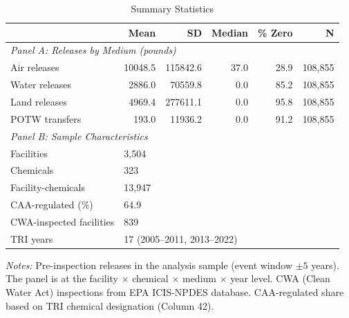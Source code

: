 \begin{table}[htbp]
\centering
\caption{Summary Statistics}
\label{tab:summary}
\begin{tabular}{lrrrrr}
\toprule
& Mean & SD & Median & \% Zero & N \\
\midrule
\multicolumn{6}{l}{\textit{Panel A: Releases by Medium (pounds)}} \\[3pt]
Air releases & 10048.5 & 115842.6 & 37.0 & 28.9 & 108,855 \\
Water releases & 2886.0 & 70559.8 & 0.0 & 85.2 & 108,855 \\
Land releases & 4969.4 & 277611.1 & 0.0 & 95.8 & 108,855 \\
POTW transfers & 193.0 & 11936.2 & 0.0 & 91.2 & 108,855 \\
\midrule
\multicolumn{6}{l}{\textit{Panel B: Sample Characteristics}} \\[3pt]
Facilities & \multicolumn{5}{l}{3,504} \\
Chemicals & \multicolumn{5}{l}{323} \\
Facility-chemicals & \multicolumn{5}{l}{13,947} \\
CAA-regulated (\%) & \multicolumn{5}{l}{64.9} \\
CWA-inspected facilities & \multicolumn{5}{l}{839} \\
TRI years & \multicolumn{5}{l}{17 (2005--2011, 2013--2022)} \\
\bottomrule
\end{tabular}
\begin{minipage}{0.95\textwidth}
\vspace{0.3em}
\footnotesize \textit{Notes:} Pre-inspection releases in the analysis sample (event window $\pm 5$ years). The panel is at the facility $\times$ chemical $\times$ medium $\times$ year level. CWA (Clean Water Act) inspections from EPA ICIS-NPDES database. CAA-regulated share based on TRI chemical designation (Column 42).
\end{minipage}
\end{table}
